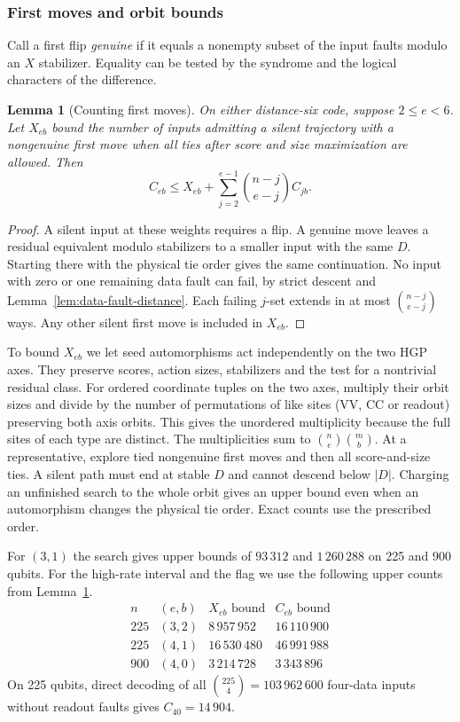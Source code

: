 \documentclass[10pt,twocolumn]{article}
\newtheorem{lemma}[theorem]{Lemma}
\theoremstyle{definition}
\begin{document}
\subsubsection{First moves and orbit bounds}\label{app:finite-orbits}
Call a first flip \emph{genuine} if it equals a nonempty subset of the
input faults modulo an $X$ stabilizer. Equality can be tested by the
syndrome and the logical characters of the difference.
\begin{lemma}[Counting first moves]\label{lem:orbit-first}
On either distance-six code, suppose $2\le e<6$. Let $X_{eb}$ bound the
number of inputs admitting a silent trajectory with a nongenuine first
move when all ties after score and size maximization are allowed. Then
\[
 C_{eb}\le X_{eb}+\sum_{j=2}^{e-1}
               \binom{n-j}{e-j} C_{jb}.
\]
\end{lemma}
\begin{proof}
A silent input at these weights requires a flip. A genuine move leaves
a residual equivalent modulo stabilizers to a smaller input with the same $D$.
Starting there with the physical tie order gives the same continuation.
No input with zero or one remaining data fault can fail, by strict
descent and Lemma~\ref{lem:data-fault-distance}. Each failing $j$-set
extends in at most $\binom{n-j}{e-j}$ ways. Any other silent first
move is included in $X_{eb}$.
\end{proof}

To bound $X_{eb}$ we let seed automorphisms act independently on the two
HGP axes. They preserve scores, action sizes, stabilizers and the test
for a nontrivial residual class. For ordered coordinate tuples on the
two axes, multiply their orbit sizes and divide by the number of
permutations of like sites (VV, CC or readout) preserving both axis
orbits. This gives the unordered multiplicity because the full sites
of each type are distinct. The multiplicities sum to
$\binom ne\binom mb$. At a representative, explore tied nongenuine
first moves and then all score-and-size ties. A silent path must end
at stable $D$ and cannot descend below $|D|$. Charging an unfinished
search to the whole orbit gives an upper bound even when an
automorphism changes the physical tie order. Exact counts use the
prescribed order.

For $(3,1)$ the search gives upper bounds of $93\,312$ and $1\,260\,288$
on 225 and 900 qubits. For the high-rate interval and the flag we use
the following upper counts from Lemma~\ref{lem:orbit-first}.
\[
\begin{array}{rcrr}
 n&(e,b)&X_{eb}\text{ bound}&C_{eb}\text{ bound}\\
 225&(3,2)&8\,957\,952&16\,110\,900\\
 225&(4,1)&16\,530\,480&46\,991\,988\\
 900&(4,0)&3\,214\,728&3\,343\,896
\end{array}
\]
On 225 qubits, direct decoding of all $\binom{225}{4}=103\,962\,600$
four-data inputs without readout faults gives $C_{40}=14\,904$.
\end{document}
